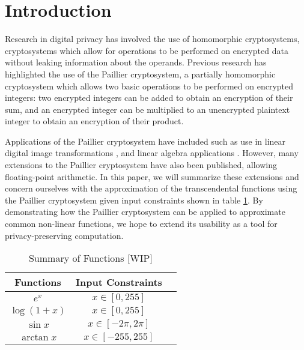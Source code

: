 \section{Introduction}
Research in digital privacy has involved the use of homomorphic cryptosystems, cryptosystems which allow for operations to be performed on encrypted data without leaking information about the operands.
Previous research has highlighted the use of the Paillier cryptosystem, a partially homomorphic cryptosystem which allows two basic operations to be performed on encrypted integers: two encrypted integers can be added to obtain an encryption of their sum, and an encrypted integer can be multiplied to an unencrypted plaintext integer to obtain an encryption of their product.

Applications of the Paillier cryptosystem have included such as use in linear digital image transformations \cite{ziad_cryptoimg:_2016}, and linear algebra applications \cite{hutchison_privacy-preserving_2009}. However, many extensions to the Paillier cryptosystem have also been published, allowing floating-point arithmetic. In this paper, we will summarize these extensions and concern ourselves with the approximation of the transcendental functions using the Paillier cryptosystem given input constraints shown in table \ref{tab:inputconstraints}. By demonstrating how the Paillier cryptosystem can be applied to approximate common non-linear functions, we hope to extend its usability as a tool for privacy-preserving computation.
\begin{table}
	\caption{Summary of Functions [WIP]}
	\label{tab:inputconstraints}
	\begin{tabular}{ccl}
		\toprule
		Functions & Input Constraints\\
		\midrule
		$e^x$ & $x\in[0,255]$\\
		$\log(1+x)$ & $x\in[0,255]$\\
		$\sin x$ & $x\in[-2\pi,2\pi]$ \\
		$\arctan x$ & $x\in[-255,255]$\\
	\bottomrule
\end{tabular}
\end{table}

